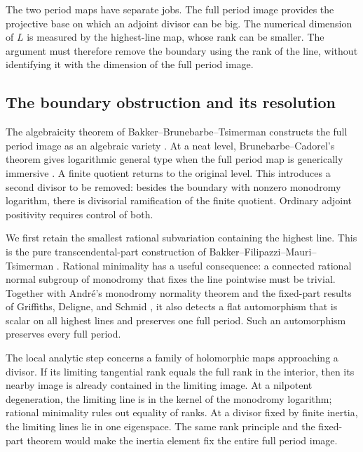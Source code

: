 The two period maps have separate jobs. The full period image provides
the projective base on which an adjoint divisor can be big. The
numerical dimension of $L$ is measured by the highest-line map,
whose rank can be smaller. The argument must therefore remove the
boundary using the rank of the line, without identifying it with
the dimension of the full period image.

\subsection{The boundary obstruction and its resolution}

The algebraicity theorem of Bakker--Brunebarbe--Tsimerman constructs
the full period image as an algebraic variety
\cite[Theorem~1.1]{BakkerBrunebarbeTsimerman}. At a neat level,
Brunebarbe--Cadorel's theorem gives logarithmic general type when
the full period map is generically immersive
\cite[Theorem~1.1]{BrunebarbeCadorel}. A finite quotient returns to
the original level. This introduces a second divisor to be removed:
besides the boundary with nonzero monodromy logarithm, there is
divisorial ramification of the finite quotient. Ordinary adjoint
positivity requires control of both.

We first retain the smallest rational subvariation containing the
highest line. This is the pure transcendental-part construction
of Bakker--Filipazzi--Mauri--Tsimerman
\cite[Definition~2.9]{BFMT}. Rational minimality has a useful
consequence: a connected rational normal subgroup of monodromy
that fixes the line pointwise must be trivial. Together with
Andr\'e's monodromy normality theorem \cite[\S5]{AndreMonodromy}
and the fixed-part results of Griffiths, Deligne, and Schmid
\cite[added note to~4.2.6 and~4.2.8(i),(ii)]{DeligneHodgeII}
\cite[Theorem~7.22 and Corollary~7.23]{Schmid},
it also detects a flat automorphism
that is scalar on all highest lines and preserves one full period.
Such an automorphism preserves every full period.

The local analytic step concerns a family of holomorphic maps
approaching a divisor. If its limiting tangential rank equals
the full rank in the interior, then its nearby image is already
contained in the limiting image. At a nilpotent degeneration,
the limiting line is in the kernel of the monodromy logarithm;
rational minimality rules out equality of ranks. At a divisor
fixed by finite inertia, the limiting lines lie in one eigenspace.
The same rank principle and the fixed-part theorem would make
the inertia element fix the entire full period image.

